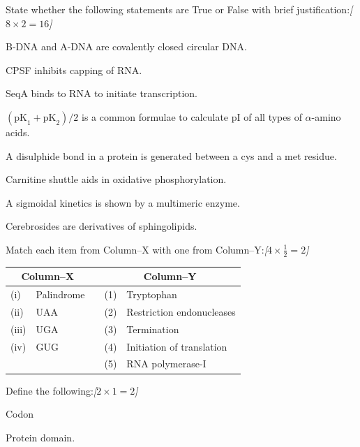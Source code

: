 \documentclass[11pt,a4paper]{article}
\newcommand{\pts}[1]{\hfill   \textit{[#1]}}
\begin{document}
\begin{parts}
  \item State whether the following statements are True or False with brief justification:\pts{$8  \times 2 = 16$}
  
\begin{parts}
    \item B-DNA and A-DNA are covalently closed circular DNA.
    \item CPSF inhibits capping of RNA.
    \item SeqA binds to RNA to initiate transcription.
    \item $( \text{pK}_1 +  \text{pK}_2)/2$ is a common formulae to calculate pI of all types of $\alpha$-amino acids.
    \item A disulphide bond in a protein is generated between a cys and a met residue.
    \item Carnitine shuttle aids in oxidative phosphorylation.
    \item A sigmoidal kinetics is shown by a multimeric enzyme.
    \item Cerebrosides are derivatives of sphingolipids.
  \end{parts}

  \item Match each item from Column--X with one from Column--Y:\pts{$4  \times \frac{1}{2} = 2$}
  
\begin{center}
  
\begin{tabular}{llp{1.5cm}ll}
    \hline
    \multicolumn{2}{c}{   \textbf{Column--X}} & & \multicolumn{2}{c}{   \textbf{Column--Y}} \\
    \hline
    (i) & Palindrome & & (1) & Tryptophan \\
    (ii) & UAA & & (2) & Restriction endonucleases \\
    (iii) & UGA & & (3) & Termination \\
    (iv) & GUG & & (4) & Initiation of translation \\
    & & & (5) & RNA polymerase-I \\
    \hline
  \end{tabular}
  \end{center}
  \medskip

  \item Define the following:\pts{$2  \times 1 = 2$}
  
\begin{parts}
    \item Codon
    \item Protein domain.
  \end{parts}
\end{parts}
\end{document}
